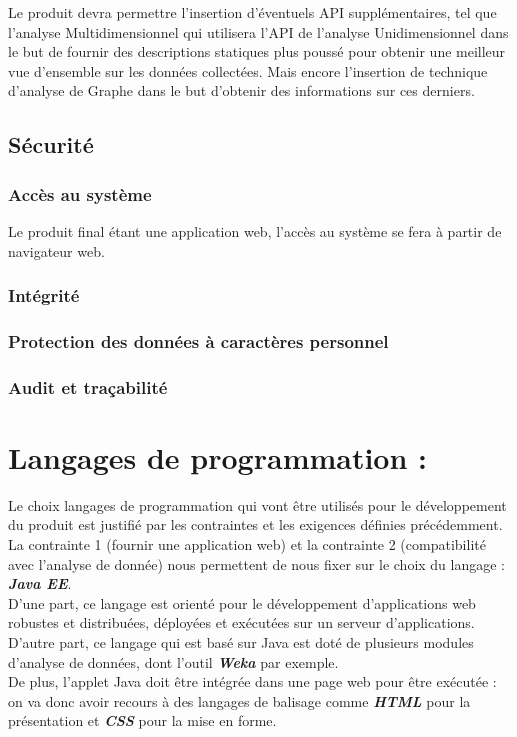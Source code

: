 		Le produit devra permettre l'insertion d'éventuels API supplémentaires, tel que l'analyse Multidimensionnel qui utilisera l'API de l'analyse Unidimensionnel dans le but de fournir des descriptions statiques plus poussé pour obtenir une meilleur vue d'ensemble sur les données collectées. Mais encore l'insertion de technique d'analyse de Graphe dans le but d'obtenir des informations sur ces derniers.
		
		\subsection{Sécurité} 
			\subsubsection{Accès au système}
			Le produit final étant une application web, l'accès au système se fera à partir de navigateur web.
			\subsubsection{Intégrité}
			\subsubsection{Protection des données à caractères personnel}
			\subsubsection{Audit et traçabilité}
		
		
	\section{Langages de programmation :} 
	Le choix langages de programmation qui vont être utilisés pour le développement du produit est justifié par les contraintes et les exigences définies précédemment.\\
	La contrainte 1 (fournir une application web) et la contrainte 2 (compatibilité avec l'analyse de donnée) nous permettent de nous fixer sur le choix du langage : \textbf{\textit{Java EE}}.\\
	D'une part, ce langage est orienté pour le développement d'applications web robustes et distribuées, déployées et exécutées sur un serveur d'applications. D'autre part, ce langage qui est basé sur Java est doté de plusieurs modules d'analyse de données, dont l'outil \textbf{\textit{Weka}} par exemple.\\
	De plus, l'applet Java doit être intégrée dans une page web pour être exécutée : on va donc avoir recours à des langages de balisage comme \textbf{\textit{HTML}} pour la présentation et \textbf{\textit{CSS}} pour la mise en forme.
		
